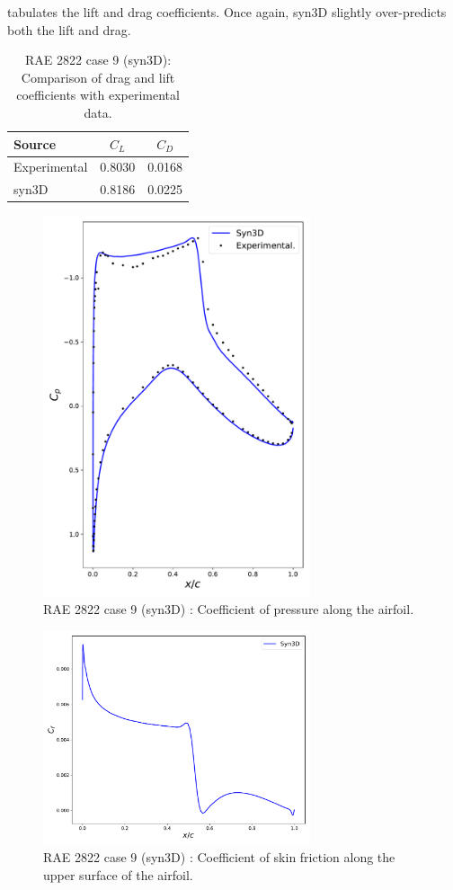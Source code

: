  tabulates the lift and drag coefficients. Once again, syn3D slightly over-predicts both the lift and drag.
\begin{table}
    \centering
    \caption{RAE 2822 case 9 (syn3D): Comparison of drag and lift coefficients with experimental data.}
    \label{tab:raecase9}
    \begin{tabular}{@{}lcc@{}}
        \toprule
        Source & $C_L$ & $C_D$ \\
        \midrule
        Experimental & 0.8030 & 0.0168 \\
        syn3D & 0.8186 & 0.0225 \\
         \bottomrule
    \end{tabular}
\end{table}
\begin{figure}
    \centering
    \includegraphics[width=0.7\textwidth]{figs/rae/cp_case9}
    \caption{RAE 2822 case 9 (syn3D) : Coefficient of pressure along the airfoil.}
    \label{fig:raecp9}
\end{figure}
\begin{figure}
    \centering
    \includegraphics[width=0.7\textwidth]{figs/rae/cf_case9}
    \caption{RAE 2822 case 9 (syn3D) : Coefficient of skin friction along the upper surface of the airfoil.}
    \label{fig:raecf9}
\end{figure}
